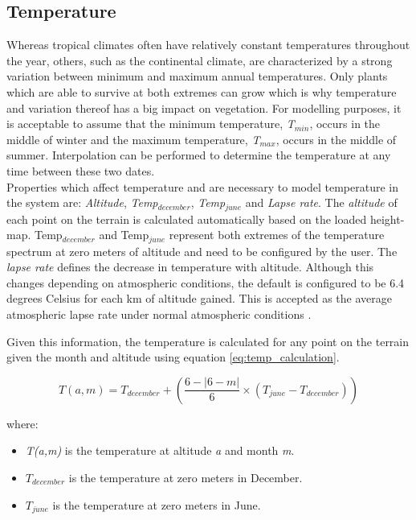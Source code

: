 \subsection{Temperature}

Whereas tropical climates often have relatively constant temperatures throughout the year, others, such as the continental climate, are characterized by a strong variation between minimum and maximum annual temperatures. Only plants which are able to survive at both extremes can grow which is why temperature and variation thereof has a big impact on vegetation. For modelling purposes, it is acceptable to assume that the minimum temperature, \textit{T$_{min}$}, occurs in the middle of winter and the maximum temperature, \textit{T$_{max}$}, occurs in the middle of summer. Interpolation can be performed to determine the temperature at any time between these two dates.\\

Properties which affect temperature and are necessary to model temperature in the system are: \textit{Altitude}, \textit{Temp$_{december}$}, \textit{Temp$_{june}$} and \textit{Lapse rate}. The \textit{altitude} of each point on the terrain is calculated automatically based on the loaded height-map. Temp$_{december}$ and Temp$_{june}$ represent both extremes of the temperature spectrum at zero meters of altitude and need to be configured by the user. The \textit{lapse rate} defines the decrease in temperature with altitude. Although this changes depending on atmospheric conditions, the default is configured to be 6.4 degrees Celsius for each km of altitude gained. This is accepted as the average atmospheric lapse rate under normal atmospheric conditions \protect\footnotemark.\\

Given this information, the temperature is calculated for any point on the terrain given the month and altitude using equation \ref{eq:temp_calculation}. 

\begin{equation} \label{eq:temp_calculation}
	T(a,m) = T_{december} + ( \frac{6 - |6-m|}{6} \times (T_{june} - T_{december}))
\end{equation}

where:
\begin{itemize}
\item \textit{T(a,m)} is the temperature at altitude \textit{a} and month \textit{m}.
\item \textit{$T_{december}$} is the temperature at zero meters in December.
\item \textit{$T_{june}$} is the temperature at zero meters in June.
\end{itemize}

